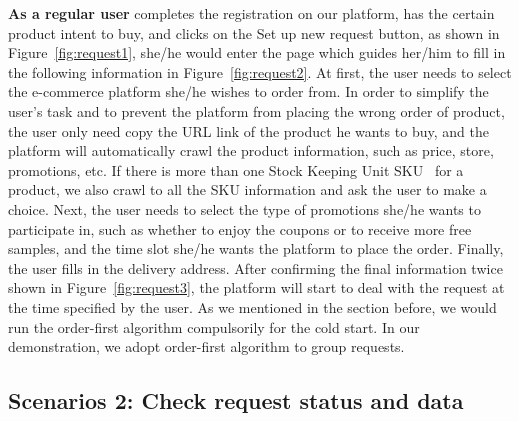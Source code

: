 \textbf{As a regular user} completes the registration on our platform, has the certain product intent to buy, and clicks on the Set up new request button, as shown in Figure~\ref{fig:request1}, she/he would enter the page which guides her/him to fill in the following information in Figure~\ref{fig:request2}. 
At first, the user needs to select the e-commerce platform she/he wishes to order from. In order to simplify the user's task and to prevent the platform from placing the wrong order of product, the user only need copy the URL link of the product he wants to buy, and the platform will automatically crawl the product information, such as price, store, promotions, etc. If there is more than one Stock Keeping Unit SKU~\cite{SKU} for a product, we also crawl to all the SKU information and ask the user to make a choice. 
Next, the user needs to select the type of promotions she/he wants to participate in, such as whether to enjoy the coupons or to receive more free samples, and the time slot she/he wants the platform to place the order. Finally, the user fills in the delivery address. After confirming the final information twice shown in Figure~\ref{fig:request3}, the platform will start to deal with the request at the time specified by the user. As we mentioned in the section before, we would run the order-first algorithm compulsorily for the cold start. In our demonstration, we adopt order-first algorithm to group requests.

\subsection{Scenarios 2: Check request status and data}

